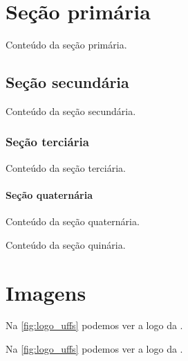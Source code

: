 \documentclass[serif, brazilian]{uffstex}
\begin{document}

\pretextual

\imprimircapa

\imprimirfolhaderosto

\tableofcontents*
\clearpage

\textual

\chapter{Seção primária}

Conteúdo da seção primária.

\section{Seção secundária}

Conteúdo da seção secundária.

\subsection{Seção terciária}

Conteúdo da seção terciária.

\subsubsection{Seção quaternária}

Conteúdo da seção quaternária.


Conteúdo da seção quinária.

\chapter{Imagens}

Na \autoref{fig:logo_uffs} podemos ver a logo da \imprimirinstituicao.

Na \cref{fig:logo_uffs} podemos ver a logo da \imprimirinstituicao.
\end{document}
